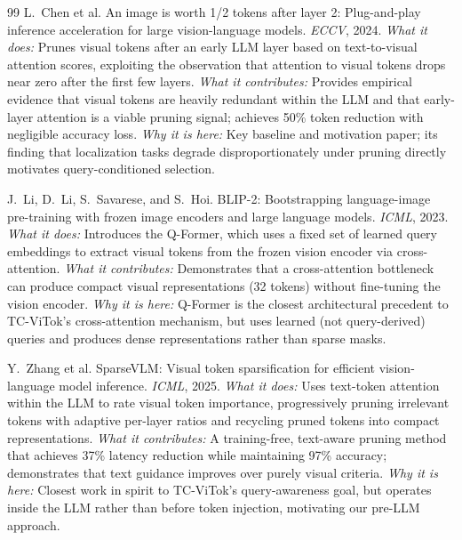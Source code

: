 \documentclass[11pt,twocolumn]{article}
\begin{document}
\begin{thebibliography}{99}
L.~Chen et al.
\newblock An image is worth 1/2 tokens after layer 2: Plug-and-play inference acceleration for large vision-language models.
\newblock \textit{ECCV}, 2024.
\newblock \textit{What it does:} Prunes visual tokens after an early LLM layer based on text-to-visual attention scores, exploiting the observation that attention to visual tokens drops near zero after the first few layers.
\newblock \textit{What it contributes:} Provides empirical evidence that visual tokens are heavily redundant within the LLM and that early-layer attention is a viable pruning signal; achieves 50\% token reduction with negligible accuracy loss.
\newblock \textit{Why it is here:} Key baseline and motivation paper; its finding that localization tasks degrade disproportionately under pruning directly motivates query-conditioned selection.

J.~Li, D.~Li, S.~Savarese, and S.~Hoi.
\newblock BLIP-2: Bootstrapping language-image pre-training with frozen image encoders and large language models.
\newblock \textit{ICML}, 2023.
\newblock \textit{What it does:} Introduces the Q-Former, which uses a fixed set of learned query embeddings to extract visual tokens from the frozen vision encoder via cross-attention.
\newblock \textit{What it contributes:} Demonstrates that a cross-attention bottleneck can produce compact visual representations (32 tokens) without fine-tuning the vision encoder.
\newblock \textit{Why it is here:} Q-Former is the closest architectural precedent to TC-ViTok's cross-attention mechanism, but uses learned (not query-derived) queries and produces dense representations rather than sparse masks.

Y.~Zhang et al.
\newblock SparseVLM: Visual token sparsification for efficient vision-language model inference.
\newblock \textit{ICML}, 2025.
\newblock \textit{What it does:} Uses text-token attention within the LLM to rate visual token importance, progressively pruning irrelevant tokens with adaptive per-layer ratios and recycling pruned tokens into compact representations.
\newblock \textit{What it contributes:} A training-free, text-aware pruning method that achieves 37\% latency reduction while maintaining 97\% accuracy; demonstrates that text guidance improves over purely visual criteria.
\newblock \textit{Why it is here:} Closest work in spirit to TC-ViTok's query-awareness goal, but operates inside the LLM rather than before token injection, motivating our pre-LLM approach.


\end{thebibliography}
\end{document}
